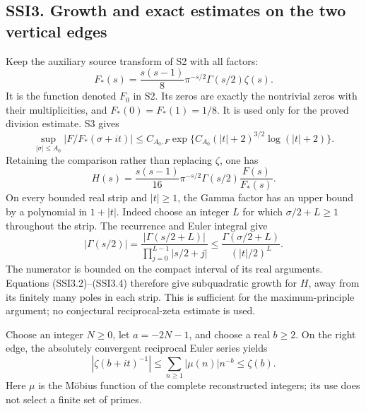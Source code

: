 \subsection{SSI3. Growth and exact estimates on the two vertical
edges}\label{ssi3.-growth-and-exact-estimates-on-the-two-vertical-edges}

Keep the auxiliary source transform of S2 with all factors: \[
F_*(s)=\frac{s(s-1)}8\pi^{-s/2}\Gamma(s/2)\zeta(s).
\tag{SSI3.1}
\] It is the function denoted \(F_0\) in S2. Its zeros are exactly the
nontrivial zeros with their multiplicities, and \(F_*(0)=F_*(1)=1/8\).
It is used only for the proved division estimate. S3 gives \[
\sup_{|\sigma|\le A_0}|F/F_*(\sigma+it)|
\le C_{A_0,F}\exp\{C_{A_0}(|t|+2)^{3/2}\log(|t|+2)\}.
\tag{SSI3.2}
\] Retaining the comparison rather than replacing \(\zeta\), one has \[
H(s)=\frac{s(s-1)}{16}\pi^{-s/2}\Gamma(s/2)
 \frac{F(s)}{F_*(s)}.
\tag{SSI3.3}
\] On every bounded real strip and \(|t|\ge1\), the Gamma factor has an
upper bound by a polynomial in \(1+|t|\). Indeed choose an integer \(L\)
for which \(\sigma/2+L\ge1\) throughout the strip. The recurrence and
Euler integral give \[
|\Gamma(s/2)|=
\frac{|\Gamma(s/2+L)|}{\prod_{j=0}^{L-1}|s/2+j|}
\le\frac{\Gamma(\sigma/2+L)}{(|t|/2)^L}.
\tag{SSI3.4}
\] The numerator is bounded on the compact interval of its real
arguments. Equations (SSI3.2)--(SSI3.4) therefore give subquadratic
growth for \(H\), away from its finitely many poles in each strip. This
is sufficient for the maximum-principle argument; no conjectural
reciprocal-zeta estimate is used.

Choose an integer \(N\ge0\), let \(a=-2N-1\), and choose a real
\(b\ge2\). On the right edge, the absolutely convergent reciprocal Euler
series yields \[
|\zeta(b+it)^{-1}|\le\sum_{n\ge1}|\mu(n)|n^{-b}\le\zeta(b).
\tag{SSI3.5}
\] Here \(\mu\) is the Möbius function of the complete reconstructed
integers; its use does not select a finite set of primes.

